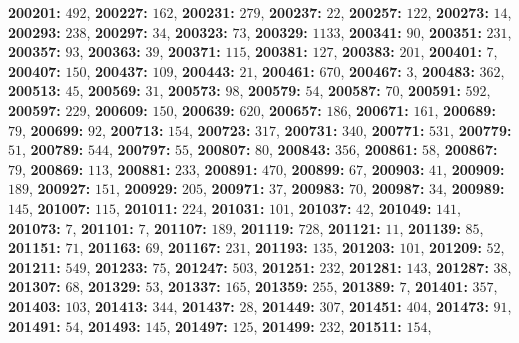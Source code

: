 \textsf{\bfseries 200201:} $492$, \textsf{\bfseries 200227:} $162$, \textsf{\bfseries 200231:} $279$, \textsf{\bfseries 200237:} $22$, \textsf{\bfseries 200257:} $122$, \textsf{\bfseries 200273:} $14$, \textsf{\bfseries 200293:} $238$, \textsf{\bfseries 200297:} $34$, \textsf{\bfseries 200323:} $73$, \textsf{\bfseries 200329:} $1133$, \textsf{\bfseries 200341:} $90$, \textsf{\bfseries 200351:} $231$, \textsf{\bfseries 200357:} $93$, \textsf{\bfseries 200363:} $39$, \textsf{\bfseries 200371:} $115$, \textsf{\bfseries 200381:} $127$, \textsf{\bfseries 200383:} $201$, \textsf{\bfseries 200401:} $7$, \textsf{\bfseries 200407:} $150$, \textsf{\bfseries 200437:} $109$, \textsf{\bfseries 200443:} $21$, \textsf{\bfseries 200461:} $670$, \textsf{\bfseries 200467:} $3$, \textsf{\bfseries 200483:} $362$, \textsf{\bfseries 200513:} $45$, \textsf{\bfseries 200569:} $31$, \textsf{\bfseries 200573:} $98$, \textsf{\bfseries 200579:} $54$, \textsf{\bfseries 200587:} $70$, \textsf{\bfseries 200591:} $592$, \textsf{\bfseries 200597:} $229$, \textsf{\bfseries 200609:} $150$, \textsf{\bfseries 200639:} $620$, \textsf{\bfseries 200657:} $186$, \textsf{\bfseries 200671:} $161$, \textsf{\bfseries 200689:} $79$, \textsf{\bfseries 200699:} $92$, \textsf{\bfseries 200713:} $154$, \textsf{\bfseries 200723:} $317$, \textsf{\bfseries 200731:} $340$, \textsf{\bfseries 200771:} $531$, \textsf{\bfseries 200779:} $51$, \textsf{\bfseries 200789:} $544$, \textsf{\bfseries 200797:} $55$, \textsf{\bfseries 200807:} $80$, \textsf{\bfseries 200843:} $356$, \textsf{\bfseries 200861:} $58$, \textsf{\bfseries 200867:} $79$, \textsf{\bfseries 200869:} $113$, \textsf{\bfseries 200881:} $233$, \textsf{\bfseries 200891:} $470$, \textsf{\bfseries 200899:} $67$, \textsf{\bfseries 200903:} $41$, \textsf{\bfseries 200909:} $189$, \textsf{\bfseries 200927:} $151$, \textsf{\bfseries 200929:} $205$, \textsf{\bfseries 200971:} $37$, \textsf{\bfseries 200983:} $70$, \textsf{\bfseries 200987:} $34$, \textsf{\bfseries 200989:} $145$, \textsf{\bfseries 201007:} $115$, \textsf{\bfseries 201011:} $224$, \textsf{\bfseries 201031:} $101$, \textsf{\bfseries 201037:} $42$, \textsf{\bfseries 201049:} $141$, \textsf{\bfseries 201073:} $7$, \textsf{\bfseries 201101:} $7$, \textsf{\bfseries 201107:} $189$, \textsf{\bfseries 201119:} $728$, \textsf{\bfseries 201121:} $11$, \textsf{\bfseries 201139:} $85$, \textsf{\bfseries 201151:} $71$, \textsf{\bfseries 201163:} $69$, \textsf{\bfseries 201167:} $231$, \textsf{\bfseries 201193:} $135$, \textsf{\bfseries 201203:} $101$, \textsf{\bfseries 201209:} $52$, \textsf{\bfseries 201211:} $549$, \textsf{\bfseries 201233:} $75$, \textsf{\bfseries 201247:} $503$, \textsf{\bfseries 201251:} $232$, \textsf{\bfseries 201281:} $143$, \textsf{\bfseries 201287:} $38$, \textsf{\bfseries 201307:} $68$, \textsf{\bfseries 201329:} $53$, \textsf{\bfseries 201337:} $165$, \textsf{\bfseries 201359:} $255$, \textsf{\bfseries 201389:} $7$, \textsf{\bfseries 201401:} $357$, \textsf{\bfseries 201403:} $103$, \textsf{\bfseries 201413:} $344$, \textsf{\bfseries 201437:} $28$, \textsf{\bfseries 201449:} $307$, \textsf{\bfseries 201451:} $404$, \textsf{\bfseries 201473:} $91$, \textsf{\bfseries 201491:} $54$, \textsf{\bfseries 201493:} $145$, \textsf{\bfseries 201497:} $125$, \textsf{\bfseries 201499:} $232$, \textsf{\bfseries 201511:} $154$, 
